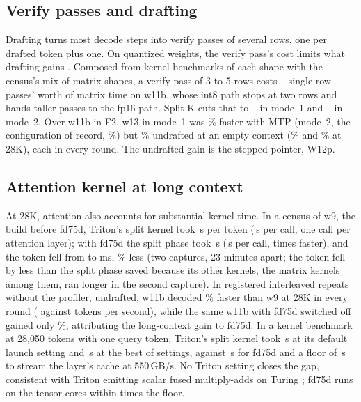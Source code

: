 \documentclass[11pt,letterpaper]{article}
\begin{document}
\subsection{Verify passes and drafting}
\label{sec:verify}
Drafting turns most decode steps into verify passes of several rows, one per
drafted token plus one. On quantized weights, the verify pass's cost limits
what drafting gains \citep{zhang2025specmquant}. Composed from kernel benchmarks of each shape with the
census's mix of matrix shapes, a verify pass of 3 to 5 rows costs
\PeVerifyAdoptLo--\PeVerifyAdoptHi{} single-row passes' worth of matrix time
on w11b, whose int8 path stops at two rows and hands taller passes to the fp16
path. Split-K cuts that to \PeVerifySOneLo--\PeVerifySOneHi{} in mode~1 and
\PeVerifySTwoLo--\PeVerifySTwoHi{} in mode~2. Over w11b in F2, w13 in mode~1
was \PeFtSplitKMtpPct\% faster with MTP (mode~2, the configuration of record,
\PeFtModeTwoOverAdoptPct\%) but \PeFtSplitKUndraftedPct\%
undrafted at an empty context (\PeFtSplitKMtpTwentyEightPct\% and
\PeFtSplitKUndraftedTwentyEightPct\% at 28K), each in every round. The
undrafted gain is the stepped pointer, W12p.



\subsection{Attention kernel at long context}
\label{sec:depth}
At 28K, attention also accounts for substantial kernel time. In a census of w9, the build before fd75d,
Triton's split kernel took \PeDepthTritonUs\,\textmu s per token
(\PeDepthTritonCall\,\textmu s per call, one call per attention layer); with
fd75d the split phase took \PeDepthFdUs\,\textmu s (\PeDepthFdCall\,\textmu s
per call, \PeDepthCallRatio{} times faster), and the token fell from
\PeDepthBefore{} to \PeDepthAfter{} ms, \PeDepthChange\% less (two captures,
23 minutes apart; the token fell by less than the split phase saved because
its other kernels, the matrix kernels among them, ran longer in the second
capture). In registered
interleaved repeats without the profiler, undrafted, w11b decoded
\PeDepthTwoGain\% faster than w9 at 28K in every round (\PeDepthTwoW{}
against \PeDepthTwoFOne{} tokens per second), while the same w11b with fd75d
switched off gained only \PeDepthTwoOff\%, attributing the long-context gain
to fd75d.
In a kernel
benchmark at 28,050 tokens with one query token, Triton's split kernel took
\PeBenchDefault\,\textmu s at its default launch setting and \PeBenchBest\,\textmu s
at the best of \PeBenchConfigs{} settings, against \PeBenchFd\,\textmu s for
fd75d and a floor of \PeBenchFloor\,\textmu s to stream the layer's cache at
550\,GB/s. No Triton setting closes the gap, consistent with Triton emitting
scalar fused multiply-adds on Turing \citep{triton5066}; fd75d runs on the tensor
cores within \PeBenchFdOverFloor{} times the floor.
\end{document}

